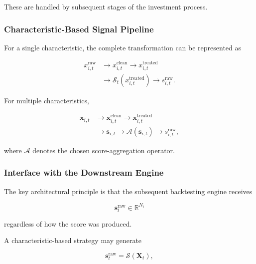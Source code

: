 \documentclass[11pt,a4paper]{article}
\begin{document}
These are handled by subsequent stages of the investment process.


\subsubsection{Characteristic-Based Signal Pipeline}

For a single characteristic, the complete transformation can be represented as

\begin{equation}
\boxed{
\begin{aligned}
x_{i,t}^{\mathrm{raw}}
&\rightarrow
x_{i,t}^{\mathrm{clean}}
\rightarrow
x_{i,t}^{\mathrm{treated}}
\\[0.1cm]
&\rightarrow
\mathcal{S}_t
\left(
x_{i,t}^{\mathrm{treated}}
\right)
\rightarrow
s_{i,t}^{\mathrm{raw}}.
\end{aligned}
}
\end{equation}

For multiple characteristics,

\begin{equation}
\boxed{
\begin{aligned}
\mathbf{x}_{i,t}
&\rightarrow
\mathbf{x}_{i,t}^{\mathrm{clean}}
\rightarrow
\mathbf{x}_{i,t}^{\mathrm{treated}}
\\[0.1cm]
&\rightarrow
\mathbf{s}_{i,t}
\rightarrow
\mathcal{A}
\left(
\mathbf{s}_{i,t}
\right)
\rightarrow
s_{i,t}^{\mathrm{raw}},
\end{aligned}
}
\end{equation}

where $\mathcal{A}$ denotes the chosen score-aggregation operator.


\subsubsection{Interface with the Downstream Engine}

The key architectural principle is that the subsequent backtesting engine
receives

\begin{equation}
\boxed{
\mathbf{s}_t^{\mathrm{raw}}
\in
\mathbb{R}^{N_t}
}
\end{equation}

regardless of how the score was produced.

A characteristic-based strategy may generate

\begin{equation}
\mathbf{s}_t^{\mathrm{raw}}
=
\mathcal{S}
\left(
\mathbf{X}_t
\right),
\end{equation}
\end{document}
